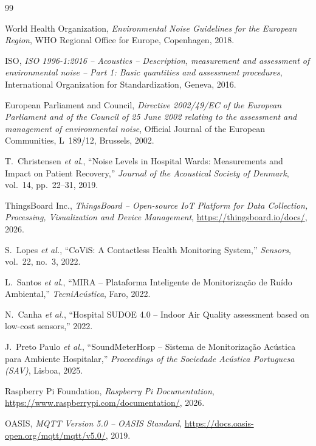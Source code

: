\documentclass[12pt,a4paper]{report}
\begin{document}
\begin{thebibliography}{99}

World Health Organization,
\textit{Environmental Noise Guidelines for the European Region},
WHO Regional Office for Europe, Copenhagen, 2018.

ISO,
\textit{ISO 1996-1:2016 -- Acoustics -- Description, measurement and assessment of environmental noise -- Part 1: Basic quantities and assessment procedures},
International Organization for Standardization, Geneva, 2016.

European Parliament and Council,
\textit{Directive 2002/49/EC of the European Parliament and of the Council of 25 June 2002 relating to the assessment and management of environmental noise},
Official Journal of the European Communities, L~189/12, Brussels, 2002.

T.~Christensen \textit{et al.},
``Noise Levels in Hospital Wards: Measurements and Impact on Patient Recovery,''
\textit{Journal of the Acoustical Society of Denmark}, vol.~14, pp.~22--31, 2019.

ThingsBoard Inc.,
\textit{ThingsBoard -- Open-source IoT Platform for Data Collection, Processing, Visualization and Device Management},
\url{https://thingsboard.io/docs/}, 2026.

S.~Lopes \textit{et al.},
``CoViS: A Contactless Health Monitoring System,''
\textit{Sensors}, vol.~22, no.~3, 2022.

L.~Santos \textit{et al.},
``MIRA -- Plataforma Inteligente de Monitorização de Ruído Ambiental,''
\textit{TecniAcústica}, Faro, 2022.

N.~Canha \textit{et al.},
``Hospital SUDOE 4.0 -- Indoor Air Quality assessment based on low-cost sensors,'' 2022.

J.~Preto Paulo \textit{et al.},
``SoundMeterHosp -- Sistema de Monitorização Acústica para Ambiente Hospitalar,''
\textit{Proceedings of the Sociedade Acústica Portuguesa (SAV)}, Lisboa, 2025.

Raspberry Pi Foundation,
\textit{Raspberry Pi Documentation},
\url{https://www.raspberrypi.com/documentation/}, 2026.

OASIS,
\textit{MQTT Version 5.0 -- OASIS Standard},
\url{https://docs.oasis-open.org/mqtt/mqtt/v5.0/}, 2019.


\end{thebibliography}
\end{document}
